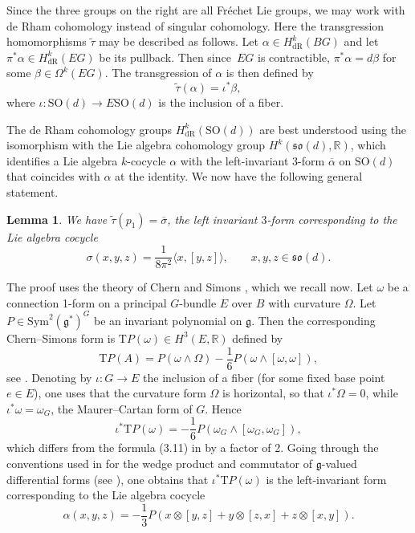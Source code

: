 \documentclass[11pt]{article}
\numberwithin{equation}{section}
\numberwithin{equation}{section}
\newtheorem{Lemma}[Theorem]{Lemma}
\newcommand{\R}{\mathbb{R}}
\newcommand{\SO}{\mathrm{SO}}
\begin{document}
Since the three groups on the right are all Fr\'echet Lie groups, we may work with de Rham cohomology instead of singular cohomology.
Here the transgression homomorphisms $\tilde{\tau}$ may be described as follows.
Let $\alpha \in H^k_{\mathrm{dR}}(BG)$ and let $\pi^*\alpha \in H^k_{\mathrm{dR}}(EG)$ be its pullback.
Then since~$EG$ is contractible, $\pi^* \alpha = d \beta$ for some $\beta \in \Omega^k(EG)$.
The transgression of $\alpha$ is then defined by
\begin{equation}
\label{DefTransgressionTilde}
	\tilde{\tau}(\alpha) = \iota^*\beta,
\end{equation}
where $\iota \colon \SO(d) \to E\SO(d)$ is the inclusion of a fiber.

The de Rham cohomology groups $H^k_{\mathrm{dR}}(\SO(d))$ are best understood using the isomorphism with the Lie algebra cohomology group $H^k(\mathfrak{so}(d), \R)$, which identifies a Lie algebra $k$-cocycle $\alpha$ with the left-invariant 3-form $\overline{\alpha}$ on $\SO(d)$ that coincides with $\alpha$ at the identity.
We now have the following general statement.

\begin{Lemma}
\label{SecondLemmaA}
We have $\tilde{\tau}(p_1) = \overline{\sigma}$, the left invariant $3$-form corresponding to the Lie algebra cocycle
\begin{equation*}
 \sigma(x, y, z) = \frac{1}{8 \pi^2} \langle x, [y, z] \rangle, \qquad x, y, z \in \mathfrak{so}(d).	
\end{equation*}
\end{Lemma}

The proof uses the theory of Chern and Simons \cite{ChernSimons}, which we recall now.
Let $\omega$ be a connection 1-form on a principal $G$-bundle $E$ over $B$ with curvature $\Omega$.
Let $P \in \mathrm{Sym}^2(\mathfrak{g}^*)^G$ be an invariant polynomial on $\mathfrak{g}$.
Then the corresponding Chern--Simons form is $\mathrm{T}P(\omega) \in H^3(E, \R)$ defined by
\begin{equation*}
 \mathrm{T}P(A) = P(\omega \wedge \Omega) - \frac{1}{6} P(\omega \wedge [\omega, \omega]),
\end{equation*}
see \cite[formula~(3.5)]{ChernSimons}.
Denoting by $\iota \colon G \to E$ the inclusion of a fiber (for some fixed base point~$e \in E$), one uses that the curvature form $\Omega$ is horizontal, so that $\iota^*\Omega = 0$, while $\iota^*\omega = \omega_G$, the Maurer--Cartan form of $G$.
Hence
\begin{equation*}
\iota^*\mathrm{T}P(\omega) = -\frac{1}{6} P(\omega_G \wedge [\omega_G, \omega_G]),
\end{equation*}
which differs from the formula (3.11) in \cite{ChernSimons} by a factor of 2.
Going through the conventions used in \cite{ChernSimons} for the wedge product and commutator of $\mathfrak{g}$-valued differential forms (see \cite[p.~50]{ChernSimons}), one obtains that $\iota^* \mathrm{T}P(\omega)$ is the left-invariant form corresponding to the Lie algebra cocycle
\begin{equation}
\label{DefinitionAlpha}
 \alpha(x, y, z) =	- \frac{1}{3} P(x \otimes [y, z] + y \otimes [z, x] + z \otimes [x, y]).
\end{equation}
\end{document}
